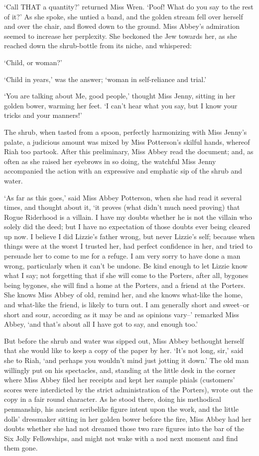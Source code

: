‘Call THAT a quantity?’ returned Miss Wren. ‘Poof! What do you say to
the rest of it?’ As she spoke, she untied a band, and the golden stream
fell over herself and over the chair, and flowed down to the ground.
Miss Abbey’s admiration seemed to increase her perplexity. She beckoned
the Jew towards her, as she reached down the shrub-bottle from its
niche, and whispered:

‘Child, or woman?’

‘Child in years,’ was the answer; ‘woman in self-reliance and trial.’

‘You are talking about Me, good people,’ thought Miss Jenny, sitting in
her golden bower, warming her feet. ‘I can’t hear what you say, but I
know your tricks and your manners!’

The shrub, when tasted from a spoon, perfectly harmonizing with Miss
Jenny’s palate, a judicious amount was mixed by Miss Potterson’s skilful
hands, whereof Riah too partook. After this preliminary, Miss Abbey read
the document; and, as often as she raised her eyebrows in so doing,
the watchful Miss Jenny accompanied the action with an expressive and
emphatic sip of the shrub and water.

‘As far as this goes,’ said Miss Abbey Potterson, when she had read it
several times, and thought about it, ‘it proves (what didn’t much need
proving) that Rogue Riderhood is a villain. I have my doubts whether he
is not the villain who solely did the deed; but I have no expectation of
those doubts ever being cleared up now. I believe I did Lizzie’s father
wrong, but never Lizzie’s self; because when things were at the worst I
trusted her, had perfect confidence in her, and tried to persuade her
to come to me for a refuge. I am very sorry to have done a man wrong,
particularly when it can’t be undone. Be kind enough to let Lizzie know
what I say; not forgetting that if she will come to the Porters, after
all, bygones being bygones, she will find a home at the Porters, and a
friend at the Porters. She knows Miss Abbey of old, remind her, and she
knows what-like the home, and what-like the friend, is likely to turn
out. I am generally short and sweet--or short and sour, according as it
may be and as opinions vary--’ remarked Miss Abbey, ‘and that’s about
all I have got to say, and enough too.’

But before the shrub and water was sipped out, Miss Abbey bethought
herself that she would like to keep a copy of the paper by her. ‘It’s
not long, sir,’ said she to Riah, ‘and perhaps you wouldn’t mind just
jotting it down.’ The old man willingly put on his spectacles, and,
standing at the little desk in the corner where Miss Abbey filed her
receipts and kept her sample phials (customers’ scores were interdicted
by the strict administration of the Porters), wrote out the copy in
a fair round character. As he stood there, doing his methodical
penmanship, his ancient scribelike figure intent upon the work, and the
little dolls’ dressmaker sitting in her golden bower before the fire,
Miss Abbey had her doubts whether she had not dreamed those two rare
figures into the bar of the Six Jolly Fellowships, and might not wake
with a nod next moment and find them gone.

